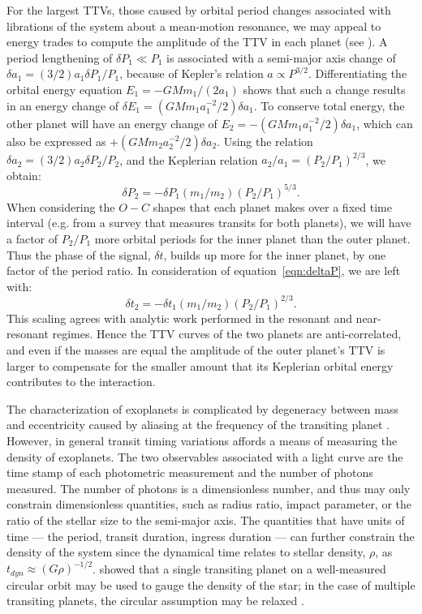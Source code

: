 \documentclass[graybox,natbib,nosecnum]{svmult}
\begin{document}
For the largest TTVs, those caused by orbital period changes associated with librations of the system about a mean-motion resonance, we may appeal to energy trades to compute the amplitude of the TTV in each planet (see \citealt{2005MNRAS.359..567A,2010Sci...330...51H}).  A period lengthening of $\delta P_1 \ll P_1$ is associated with a semi-major axis change of $\delta a_1 = (3/2) a_1 \delta P_1 / P_1$, because of Kepler's relation $a \propto P^{3/2}$.  Differentiating the orbital energy equation $E_1=-G M m_1 /(2a_1)$ shows that such a change results in an energy change of $\delta E_1=(GMm_1 a_1^{-2}/2) \delta a_1$.  To conserve total energy, the other planet will have an energy change of $E_2=-(GMm_1 a_1^{-2}/2) \delta a_1$, which can also be expressed as $+(GMm_2 a_2^{-2}/2)\delta a_2$.  Using the relation $\delta a_2 = (3/2) a_2 \delta P_2 / P_2$, and the Keplerian relation $a_2/a_1=(P_2/P_1)^{2/3}$, we obtain: 
\begin{equation}
\delta P_2 = -\delta P_1 (m_1/m_2) (P_2/P_1)^{5/3}. \label{eqn:deltaP}
\end{equation}
When considering the $O-C$ shapes that each planet makes over a fixed time interval (e.g. from a survey that measures transits for both planets), we will have a factor of $P_2/P_1$ more orbital periods for the inner planet than the outer planet.  Thus the phase of the signal, $\delta t$, builds up more for the inner planet, by one factor of the period ratio. In consideration of equation~\ref{eqn:deltaP}, we are left with: 
\begin{equation}
\delta t_2 = -\delta t_1 (m_1/m_2) (P_2/P_1)^{2/3}. \label{eqn:deltat}
\end{equation}
This scaling agrees with analytic work performed in the resonant \citep{2016ApJ...823...72N} and near-resonant \citep{2012ApJ...761..122L} regimes. Hence the TTV curves of the two planets are anti-correlated, and even if the masses are equal the amplitude of the outer planet's TTV is larger to compensate for the smaller amount that its Keplerian orbital energy contributes to the interaction. 

The characterization of exoplanets is complicated by degeneracy between mass and eccentricity
caused by aliasing at the frequency of the transiting planet \citep{2012ApJ...761..122L,2015ApJ...802..116D}.  
However, in general transit timing variations affords a means of measuring the density of exoplanets.
The two observables associated with a light curve are the time stamp of each photometric
measurement and the number of photons measured.  The number of photons is a dimensionless
number, and thus may only constrain dimensionless quantities, such as radius ratio, impact 
parameter, or the ratio of the stellar size to the semi-major axis.  The quantities that 
have units of time --- the period, transit duration, ingress duration ---  can further
constrain the density of the system since the dynamical time relates to stellar density, $\rho$, as
$t_{dyn} \approx (G\rho)^{-1/2}$.  \citet{2003ApJ...585.1038S} showed that a single transiting planet
on a well-measured circular orbit may be used to gauge the density of the star;
in the case of multiple transiting planets, the circular assumption may be relaxed
\citep{2014MNRAS.440.2164K}.
\end{document}
